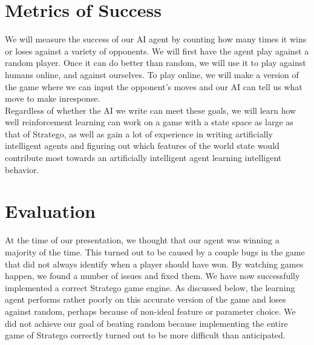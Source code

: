 \documentclass[letterpaper]{article}
\begin{document}
%

\section{Metrics of Success}
We will measure the success of our AI agent by counting how many times it wins or loses against a variety of opponents. We will first have the agent play against a random player. Once it can do better than random, we will use it to play against humans online, and against ourselves.  To play online, we will make a version of the game where we can input the opponent's moves and our AI can tell us what move to make inresponse.\\

Regardless of whether the AI we write can meet these goals, we will learn how well reinforcement learning can work on a game with a state space as large as that of Stratego, as well as gain a lot of experience in writing artificially intelligent agents and figuring out which features of the world state would contribute most towards an artificially intelligent agent learning intelligent behavior.
\\

\section{Evaluation}
At the time of our presentation, we thought that our agent was winning a majority of the time. This turned out to be caused
by a couple bugs in the game that did not always identify when a player should have won. 
By watching games happen, we found a number of 
issues and fixed them. We have now successfully implemented a correct Stratego game engine. As discussed below, the learning 
agent performs rather poorly on this accurate version of the game and loses against random, perhaps because of non-ideal
feature or parameter choice. We did not achieve our goal of beating random because implementing the entire game of Stratego 
correctly turned out to be more difficult than anticipated.
\end{document}
